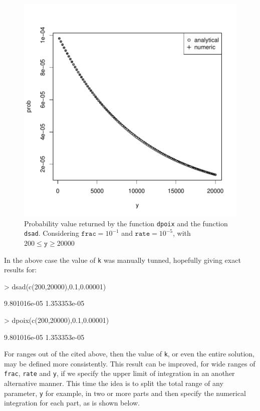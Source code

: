 \documentclass{article}
\newcommand{\code}[1]{\texttt{#1}}
\begin{document}
\begin{figure}[ht]
  \begin{center}
\includegraphics{sads_tutorial-009}
\end{center}
\caption{Probability value returned by the function \code{dpoix} and the function \code{dsad}. Considering $\code{frac}=10^{-1}$ and $\code{rate}=10^{-5}$, with $200 \leq \code{y} \geq 20000$}
\label{fig:k}
\end{figure}

In the above case the value of \code{k} was manually tunned, hopefully giving exact results for:

\begin{Schunk}
\begin{Sinput}
> dsad(c(200,20000),0.1,0.00001)
\end{Sinput}
\begin{Soutput}
[1] 9.801016e-05 1.353353e-05
\end{Soutput}
\begin{Sinput}
> dpoix(c(200,20000),0.1,0.00001)
\end{Sinput}
\begin{Soutput}
[1] 9.801016e-05 1.353353e-05
\end{Soutput}
\end{Schunk}

For ranges out of the cited above, then the value of \code{k}, or even the entire solution, may be defined more consistently. This result can be improved, for wide ranges of \code{frac}, \code{rate} and \code{y}, if we specify 
the upper limit of integration in an another alternative manner. This time the idea is to split the total range of any parameter, \code{y} for example, in two or more parts and then specify the numerical integration for each part, as is shown below.
\end{document}
